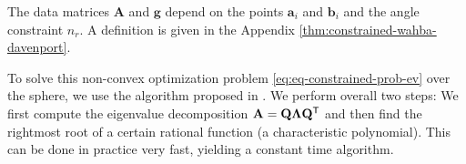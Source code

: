 The data matrices $\mathbf{A}$ and $\mathbf{g}$ depend on the points $\mathbf{a}_i$ and $\mathbf{b}_i$ and the angle constraint $n_r$. A definition is given in the Appendix \ref{thm:constrained-wahba-davenport}.

To solve this non-convex optimization problem \ref{eq:eq-constrained-prob-ev} over the sphere, we use the algorithm proposed in \cite{10.1007/978-3-642-75536-1_57}. We perform overall two steps: We first compute the eigenvalue decomposition $\mathbf{A} = \mathbf{Q}\mathbf{\Lambda}\mathbf{Q}^{\mathsf{T}}$ and then find the rightmost root of a certain rational function (a characteristic polynomial). This can be done in practice very fast, yielding a constant time algorithm.
